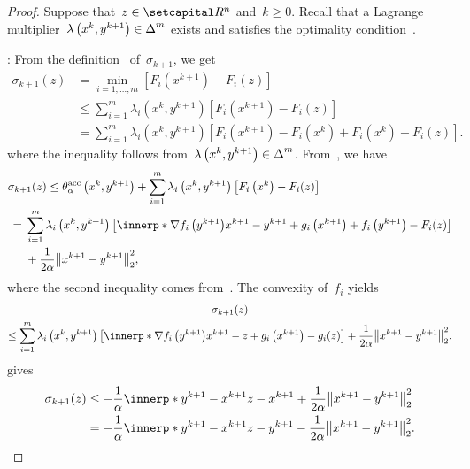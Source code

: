 \documentclass[../main]{subfiles}
\begin{document}
\begin{proof}
    Suppose that~$z \in \setR^n$ and~$k \ge 0$.
    Recall that a Lagrange multiplier~$\lambda\left( x^k, y^{k + 1} \right) \in \operatorname{\Delta}^m$ exists and satisfies the optimality condition~.
    
    :
    From the definition~ of~$\sigma_{k + 1}$, we get
    \begin{align}
        \sigma_{k + 1}(z) &= \min_{i = 1, \dots, m} \left[ F_i\left(x^{k + 1}\right) - F_i(z) \right] \\
                          &\le \sum_{i = 1}^m \lambda_i\left( x^k, y^{k + 1} \right) \left[ F_i\left(x^{k + 1}\right) - F_i(z) \right] \\
                          &= \sum_{i = 1}^{m} \lambda_i\left( x^k, y^{k + 1} \right) \left[ F_i\left(x^{k + 1}\right) - F_i\left( x^k \right) + F_i\left( x^k \right) - F_i(z) \right]
    .\end{align}
    where the inequality follows from~$\lambda\left( x^k, y^{k + 1} \right) \in \operatorname{\Delta}^m$.
    From~, we have
    \begin{align}
        \MoveEqLeft[1.5] \sigma_{k + 1}(z) \le \theta^\acc_\alpha\left( x^k, y^{k + 1} \right) + \sum_{i = 1}^{m} \lambda_i\left( x^k, y^{k + 1} \right) \left[ F_i\left( x^k \right) - F_i(z) \right] \\
        ={}& \sum_{i = 1}^{m} \lambda_i\left( x^k, y^{k + 1} \right) \left[ \innerp*{\nabla f_i\left( y^{k + 1} \right) }{x^{k + 1} - y^{k + 1}} + g_i\left( x^{k + 1} \right) + f_i\left( y^{k + 1} \right) - F_i(z) \right] \\
           &+ \frac{1}{2 \alpha} \norm*{x^{k + 1} - y^{k + 1}}_2^2
    ,\end{align}
    where the second inequality comes from~.
    The convexity of~$f_i$ yields
    \begin{multline}
        \sigma_{k + 1}(z) \\
        \le \sum_{i = 1}^{m} \lambda_i\left( x^k, y^{k + 1} \right) \left[ \innerp*{\nabla f_i\left( y^{k + 1} \right) }{x^{k + 1} - z} + g_i\left( x^{k + 1} \right) - g_i(z) \right] + \frac{1}{2 \alpha} \norm*{x^{k + 1} - y^{k + 1}}_2^2
    .\end{multline}
     gives
    \begin{align}
        \sigma_{k + 1}(z) &\le - \frac{1}{\alpha} \innerp*{y^{k + 1} - x^{k + 1}}{z - x^{k + 1}} + \frac{1}{2 \alpha} \norm*{x^{k + 1} - y^{k + 1}}_2^2 \\
                          &= - \frac{1}{\alpha} \innerp*{y^{k + 1} - x^{k + 1}}{z - y^{k + 1}} - \frac{1}{2 \alpha} \norm*{x^{k + 1} - y^{k + 1}}_2^2
    .\end{align}


\end{proof}
\end{document}
